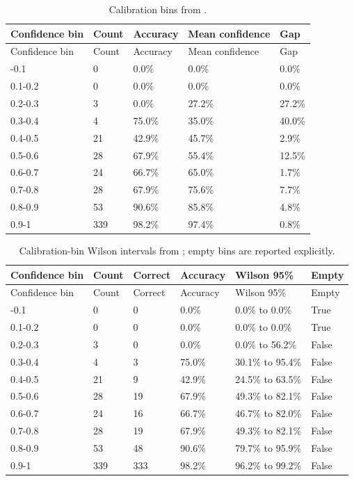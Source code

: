 \documentclass[
]{article}
\begin{document}
\begin{longtable}[]{@{}lllll@{}}
\caption{Calibration bins from
\protect{}.}\label{tbl:calibration-bins}\tabularnewline
\toprule\noalign{}
Confidence bin & Count & Accuracy & Mean confidence & Gap \\
\midrule\noalign{}
\endfirsthead
\toprule\noalign{}
Confidence bin & Count & Accuracy & Mean confidence & Gap \\
\midrule\noalign{}
\endhead
\bottomrule\noalign{}
\endlastfoot
0-0.1 & 0 & 0.0\% & 0.0\% & 0.0\% \\
0.1-0.2 & 0 & 0.0\% & 0.0\% & 0.0\% \\
0.2-0.3 & 3 & 0.0\% & 27.2\% & 27.2\% \\
0.3-0.4 & 4 & 75.0\% & 35.0\% & 40.0\% \\
0.4-0.5 & 21 & 42.9\% & 45.7\% & 2.9\% \\
0.5-0.6 & 28 & 67.9\% & 55.4\% & 12.5\% \\
0.6-0.7 & 24 & 66.7\% & 65.0\% & 1.7\% \\
0.7-0.8 & 28 & 67.9\% & 75.6\% & 7.7\% \\
0.8-0.9 & 53 & 90.6\% & 85.8\% & 4.8\% \\
0.9-1 & 339 & 98.2\% & 97.4\% & 0.8\% \\
\end{longtable}

\begin{longtable}[]{@{}llllll@{}}
\caption{Calibration-bin Wilson intervals from
\protect{}; empty
bins are reported
explicitly.}\label{tbl:calibration-bin-intervals}\tabularnewline
\toprule\noalign{}
Confidence bin & Count & Correct & Accuracy & Wilson 95\% & Empty \\
\midrule\noalign{}
\endfirsthead
\toprule\noalign{}
Confidence bin & Count & Correct & Accuracy & Wilson 95\% & Empty \\
\midrule\noalign{}
\endhead
\bottomrule\noalign{}
\endlastfoot
0-0.1 & 0 & 0 & 0.0\% & 0.0\% to 0.0\% & True \\
0.1-0.2 & 0 & 0 & 0.0\% & 0.0\% to 0.0\% & True \\
0.2-0.3 & 3 & 0 & 0.0\% & 0.0\% to 56.2\% & False \\
0.3-0.4 & 4 & 3 & 75.0\% & 30.1\% to 95.4\% & False \\
0.4-0.5 & 21 & 9 & 42.9\% & 24.5\% to 63.5\% & False \\
0.5-0.6 & 28 & 19 & 67.9\% & 49.3\% to 82.1\% & False \\
0.6-0.7 & 24 & 16 & 66.7\% & 46.7\% to 82.0\% & False \\
0.7-0.8 & 28 & 19 & 67.9\% & 49.3\% to 82.1\% & False \\
0.8-0.9 & 53 & 48 & 90.6\% & 79.7\% to 95.9\% & False \\
0.9-1 & 339 & 333 & 98.2\% & 96.2\% to 99.2\% & False \\
\end{longtable}
\end{document}
